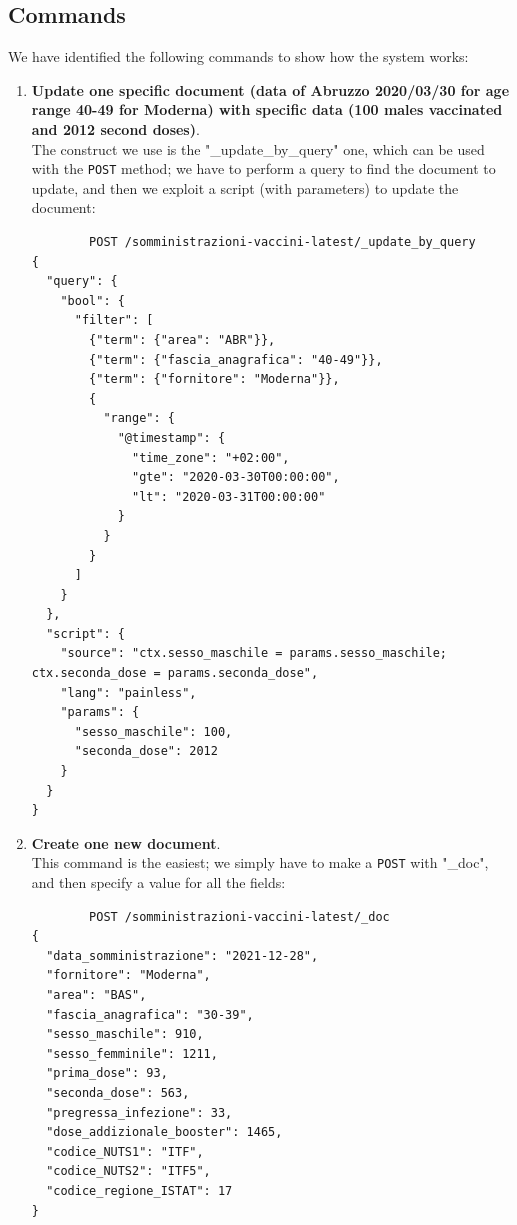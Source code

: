 \documentclass{article}
\begin{document}
\subsection{Commands}
We have identified the following commands to show how the system works:\\
\begin{enumerate}
    \item \textbf{Update one specific document (data of Abruzzo 2020/03/30 for age range 40-49 for Moderna) with specific data (100 males vaccinated and 2012 second doses)}.\\
    The construct we use is the "\_update\_by\_query" one, which can be used with the \verb|POST| method; we have to perform a query to find the document to update, and then we exploit a script (with parameters) to update the document:
\begin{lstlisting}
        POST /somministrazioni-vaccini-latest/_update_by_query
{
  "query": {
    "bool": {
      "filter": [
        {"term": {"area": "ABR"}},
        {"term": {"fascia_anagrafica": "40-49"}},
        {"term": {"fornitore": "Moderna"}},
        {
          "range": {
            "@timestamp": {
              "time_zone": "+02:00",
              "gte": "2020-03-30T00:00:00",
              "lt": "2020-03-31T00:00:00"
            }
          }
        }
      ]
    }
  },
  "script": {
    "source": "ctx.sesso_maschile = params.sesso_maschile; ctx.seconda_dose = params.seconda_dose",
    "lang": "painless",
    "params": {
      "sesso_maschile": 100,
      "seconda_dose": 2012
    }
  }
}
\end{lstlisting}
\item \textbf{Create one new document}.\\
This command is the easiest; we simply have to make a \verb|POST| with "\_doc", and then specify a value for all the fields:
\begin{lstlisting}
        POST /somministrazioni-vaccini-latest/_doc
{
  "data_somministrazione": "2021-12-28",
  "fornitore": "Moderna",
  "area": "BAS",
  "fascia_anagrafica": "30-39",
  "sesso_maschile": 910,
  "sesso_femminile": 1211,
  "prima_dose": 93,
  "seconda_dose": 563,
  "pregressa_infezione": 33,
  "dose_addizionale_booster": 1465,
  "codice_NUTS1": "ITF",
  "codice_NUTS2": "ITF5",
  "codice_regione_ISTAT": 17
}
\end{lstlisting}
\end{enumerate}
\end{document}
